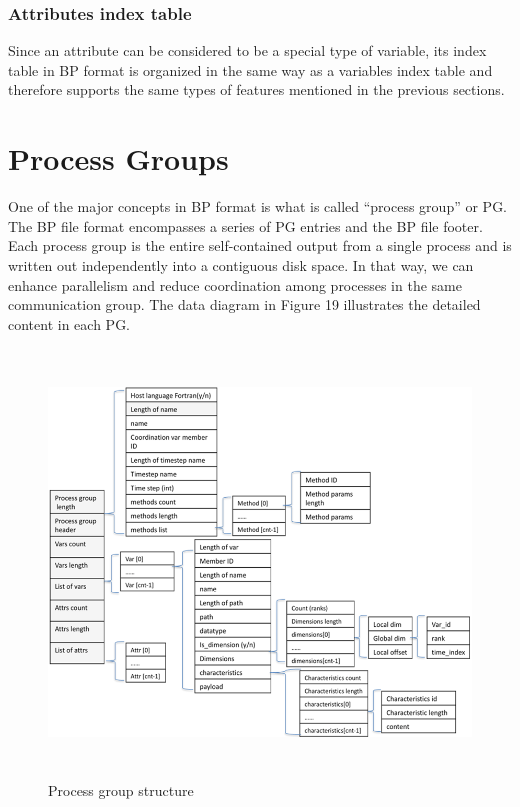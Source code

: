 \subsubsection{Attributes index table}

Since an attribute can be considered to be a special type of variable, its index 
table in BP format is organized in the same way as a variables index table and 
therefore supports the same types of features mentioned in the previous sections. 

\section{Process Groups}

One of the major concepts in BP format is what is called ``process group'' or PG. 
The BP file format encompasses a series of PG entries and the BP file footer. Each 
process group is the entire self-contained output from a single process and is 
written out independently into a contiguous disk space. In that way, we can enhance 
parallelism and reduce coordination among processes in the same communication group. 
The data diagram in Figure 19 illustrates the detailed content in each PG. 

\begin{figure}[htbp]
\begin{center}
\includegraphics[width=389pt, height=321pt]{ADIOS-Manual-fig032.png}
\caption{Process group structure}
\end{center}
\end{figure}\label{HRef119578960}\label{HToc144350178}

